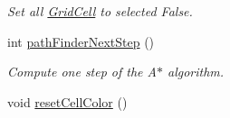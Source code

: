 \begin{DoxyCompactItemize}
\begin{DoxyCompactList}\small\item\em Set all \hyperlink{classGridCell}{Grid\+Cell} to selected False. \end{DoxyCompactList}\item 
int \hyperlink{classGridMap_a095c92e0c8abe909144cd9bf03fb2675}{path\+Finder\+Next\+Step} ()
\begin{DoxyCompactList}\small\item\em Compute one step of the A$\ast$ algorithm. \end{DoxyCompactList}\item 
void \hyperlink{classGridMap_ae2eb9ca9d4f2f1552f200ce4b9582d01}{reset\+Cell\+Color} ()\hypertarget{classGridMap_ae2eb9ca9d4f2f1552f200ce4b9582d01}{}\label{classGridMap_ae2eb9ca9d4f2f1552f200ce4b9582d01}


\end{DoxyCompactItemize}
